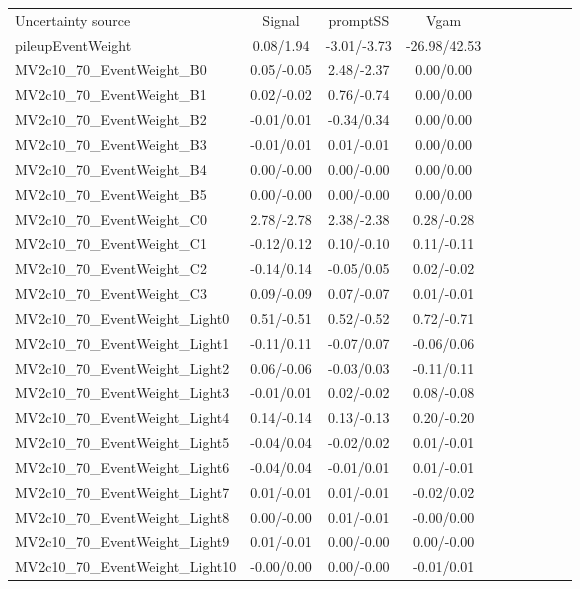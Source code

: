 \begin{table}[h]
\scriptsize
\begin{center}
\begin{tabular}{l|ccccccccc}
\hline
\hline
Uncertainty source &Signal &promptSS &Vgam \\
pileupEventWeight &0.08/1.94 &-3.01/-3.73 &-26.98/42.53 \\
MV2c10\_70\_EventWeight\_B0 &0.05/-0.05 &2.48/-2.37 &0.00/0.00 \\
MV2c10\_70\_EventWeight\_B1 &0.02/-0.02 &0.76/-0.74 &0.00/0.00 \\
MV2c10\_70\_EventWeight\_B2 &-0.01/0.01 &-0.34/0.34 &0.00/0.00 \\
MV2c10\_70\_EventWeight\_B3 &-0.01/0.01 &0.01/-0.01 &0.00/0.00 \\
MV2c10\_70\_EventWeight\_B4 &0.00/-0.00 &0.00/-0.00 &0.00/0.00 \\
MV2c10\_70\_EventWeight\_B5 &0.00/-0.00 &0.00/-0.00 &0.00/0.00 \\
MV2c10\_70\_EventWeight\_C0 &2.78/-2.78 &2.38/-2.38 &0.28/-0.28 \\
MV2c10\_70\_EventWeight\_C1 &-0.12/0.12 &0.10/-0.10 &0.11/-0.11 \\
MV2c10\_70\_EventWeight\_C2 &-0.14/0.14 &-0.05/0.05 &0.02/-0.02 \\
MV2c10\_70\_EventWeight\_C3 &0.09/-0.09 &0.07/-0.07 &0.01/-0.01 \\
MV2c10\_70\_EventWeight\_Light0 &0.51/-0.51 &0.52/-0.52 &0.72/-0.71 \\
MV2c10\_70\_EventWeight\_Light1 &-0.11/0.11 &-0.07/0.07 &-0.06/0.06 \\
MV2c10\_70\_EventWeight\_Light2 &0.06/-0.06 &-0.03/0.03 &-0.11/0.11 \\
MV2c10\_70\_EventWeight\_Light3 &-0.01/0.01 &0.02/-0.02 &0.08/-0.08 \\
MV2c10\_70\_EventWeight\_Light4 &0.14/-0.14 &0.13/-0.13 &0.20/-0.20 \\
MV2c10\_70\_EventWeight\_Light5 &-0.04/0.04 &-0.02/0.02 &0.01/-0.01 \\
MV2c10\_70\_EventWeight\_Light6 &-0.04/0.04 &-0.01/0.01 &0.01/-0.01 \\
MV2c10\_70\_EventWeight\_Light7 &0.01/-0.01 &0.01/-0.01 &-0.02/0.02 \\
MV2c10\_70\_EventWeight\_Light8 &0.00/-0.00 &0.01/-0.01 &-0.00/0.00 \\
MV2c10\_70\_EventWeight\_Light9 &0.01/-0.01 &0.00/-0.00 &0.00/-0.00 \\
MV2c10\_70\_EventWeight\_Light10 &-0.00/0.00 &0.00/-0.00 &-0.01/0.01 \\

\end{tabular}
\end{center}
\end{table}
